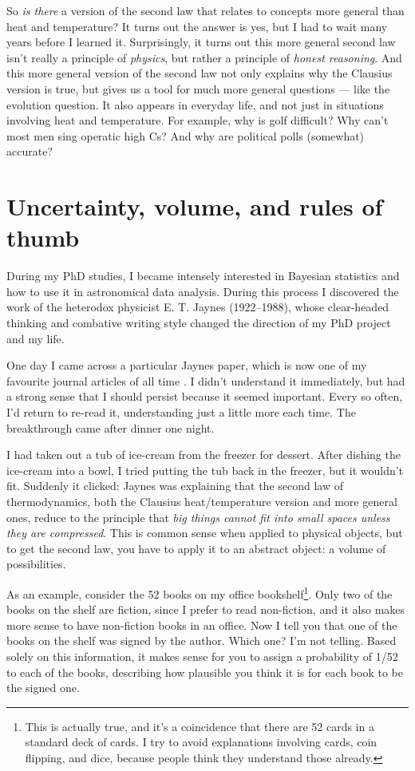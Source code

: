 \documentclass[a4paper, 12pt]{article}
\begin{document}
So {\em is there} a version of the second law that relates to concepts more
general than heat and temperature?
It turns out the answer is yes, but I had to wait many years before I learned it.
Surprisingly, it turns out this more general second law isn't really a
principle of {\em physics}, but rather a
principle of {\em honest reasoning}. And this more general version of the
second law not only explains why the Clausius version is true, but gives us
a tool for much more general questions --- like the evolution question.
It also appears in everyday life, and not just in situations involving heat and
temperature. For example,
why is golf difficult? Why can't most men sing operatic high Cs?
And why are political polls (somewhat) accurate?

\section*{Uncertainty, volume, and rules of thumb}
During my PhD studies, I became intensely interested in Bayesian statistics
\citep{brewer}
and how to use it in astronomical data analysis. During this process I
discovered the work of the heterodox physicist E. T. Jaynes \citep{jaynes_site}
(1922--1988), whose clear-headed thinking and combative writing style
changed the direction of my PhD project and my life.

One day I came across a particular Jaynes paper, which is now one of my
favourite journal articles of all time
\citep{jaynes}. I didn't understand it
immediately, but had a strong sense that I should persist because it seemed
important. Every so often, I'd return to re-read it, understanding
just a little more each time. The breakthrough came after dinner one
night.

I had taken out a tub of ice-cream from the freezer for dessert. After dishing
the ice-cream into a bowl, I tried putting the tub back in the freezer, but
it wouldn't fit. Suddenly it clicked: Jaynes was explaining that
the second law of thermodynamics, both the Clausius heat/temperature version
and more general ones, reduce to the
principle that {\em big things cannot fit into small spaces unless they are
compressed}. This is common sense when applied to physical objects, but to
get the second law, you have to apply it to an abstract object: a volume
of possibilities.

As an example, consider the 52 books on my office bookshelf\footnote{This
is actually true, and it's a coincidence that there are 52 cards in a standard
deck of cards. I try to avoid explanations involving cards, coin flipping, and
dice, because people think they understand those already.}.
Only two of the books on the shelf are fiction, since I prefer to read
non-fiction, and it also makes more sense to have non-fiction books in an
office. Now I tell you that one of the books on the shelf was
signed by the author. Which one? I'm not telling. Based solely on this
information, it makes sense for you to assign a probability of 1/52 to each of the
books, describing how plausible you think it is for each book to be the signed
one.
\end{document}
